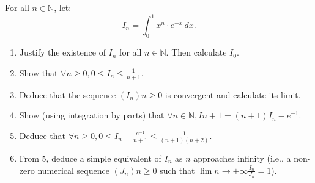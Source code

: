 \documentclass[12pt]{article}
\begin{document}
\newpage

\begin{answerbox}


\end{answerbox}

\newpage

\section{}
For all $n \in \mathbb{N}$, let:
$$I_n=\int_{0}^{1} x^n \cdot e^{-x} \, dx.$$
\begin{enumerate}
\item Justify the existence of $I_n$ for all $n \in \mathbb{N}$. Then calculate $I_0$.
\item Show that $\forall n \geq 0, 0 \leq I_n \leq \frac{1}{n+1}$.
\item Deduce that the sequence $(I_n){n \geq 0}$ is convergent and calculate its limit.
\item Show (using integration by parts) that $\forall n \in \mathbb{N}, I{n+1} = (n+1)I_n - e^{-1}$.
\item Deduce that $\forall n \geq 0, 0 \leq I_n - \frac{e^{-1}}{n+1} \leq \frac{1}{(n+1)(n+2)}$.
\item From 5, deduce a simple equivalent of $I_n$ as $n$ approaches infinity (i.e., a non-zero numerical sequence $(J_n){n \geq 0}$ such that $\lim{n \to +\infty} \frac{I_n}{J_n} = 1$).
\end{enumerate}

\newpage

\begin{answerbox}


\end{answerbox}

\end{document}
